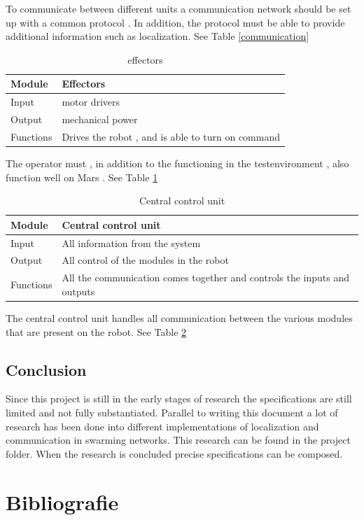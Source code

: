 \documentclass[10pt,a4paper]{article}
\begin{document}
To communicate between different units a communication network should be set up with a common protocol . In addition, the protocol must be able to provide additional information such as localization. See Table \ref{communication} \\

\begin{table}[H]
\centering
\caption{effectors}
\label{Effectors}
\begin{tabular}{|l|l|}
\hline
Module    & Effectors \\ \hline
Input  & motor drivers  \\ \hline
Output & mechanical power   \\ \hline
Functions  & Drives the robot , and is able to turn on command            \\ \hline
\end{tabular}
\end{table}

The operator must , in addition to the functioning in the testenvironment , also function well on Mars . See Table \ref{Effectors} \\

\begin{table}[H]
\centering
\caption{Central control unit}
\label{control}
\begin{tabular}{|l|l|}
\hline
Module    & Central control unit \\ \hline
Input  & All information from the system  \\ \hline
Output & All control of the modules in the robot \\ \hline
Functions  & All the communication comes together and controls the inputs and outputs            \\ \hline
\end{tabular}
\end{table}

The central control unit handles all communication between the various modules that are present on the robot. See Table \ref{control}

\subsection{Conclusion}
Since this project is still in the early stages of research the specifications are still limited and not fully substantiated. Parallel to writing this document a lot of research has been done into different implementations of localization and communication in swarming networks. This research can be found in the project folder. When the research is concluded precise specifications can be composed. 

\newpage

\section{Bibliografie}


\end{document}
